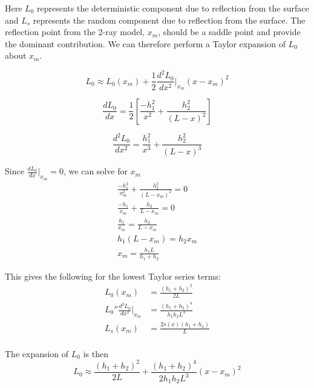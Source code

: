 Here $L_0$ represents the deterministic component due to reflection from the surface and $L_s$ represents the random component due to reflection from the surface. The reflection point from the 2-ray model, $x_m$, should be a saddle point and provide the dominant contribution. We can therefore perform a Taylor expansion of $L_0$ about $x_m$.

\begin{equation}
L_0 \approx L_0(x_m) + \frac{1}{2}\frac{d^2L_0}{dx^2}\bigg|_{x_m}(x-x_m)^2
\label{mp_eq:14}
\end{equation}

\begin{equation}
\frac{dL_0}{dx} = \frac{1}{2}\left[\frac{-h_1^2}{x^2} + \frac{h_2^2}{(L-x)^2} \right]
\label{mp_eq:15}
\end{equation}

\begin{equation}
\frac{d^2L_0}{dx^2} = \frac{h_1^2}{x^3} + \frac{h_2^2}{(L-x)^3} 
\label{mp_eq:16}
\end{equation}

Since $\frac{dL_0}{dx}\big|_{x_m} = 0$, we can solve for $x_m$
\begin{equation}
\begin{gathered}
\frac{-h_1^2}{x_m^2} + \frac{h_2^2}{(L-x_m)^2} = 0\\
\frac{-h_1}{x_m} + \frac{h_2}{L-x_m} = 0\\
\frac{h_1}{x_m} = \frac{h_2}{L-x_m}\\
h_1(L-x_m) = h_2x_m\\
x_m = \frac{h_1L}{h_1+h_2}
\end{gathered}
\label{mp_eq:17}
\end{equation}

This gives the following for the lowest Taylor series terms:
\begin{equation}
\begin{aligned}
L_0(x_m) &= \frac{(h_1+h_2)^2}{2L} \\
L_0''\frac{d^2L_0}{dx^2}\bigg|_{x_m}  &= \frac{(h_1+h_2)^4}{h_1h_2L^3} \\
L_s(x_m) &= \frac{2s(x)(h_1 + h_2)}{L}\\
\end{aligned}
\label{mp_eq:17a}
\end{equation}

The expansion of $L_0$ is then
\begin{equation}
L_0 \approx \frac{(h_1+h_2)^2}{2L} + \frac{(h_1+h_2)^4}{2h_1h_2L^3}(x-x_m)^2
\label{mp_eq:18}
\end{equation}

